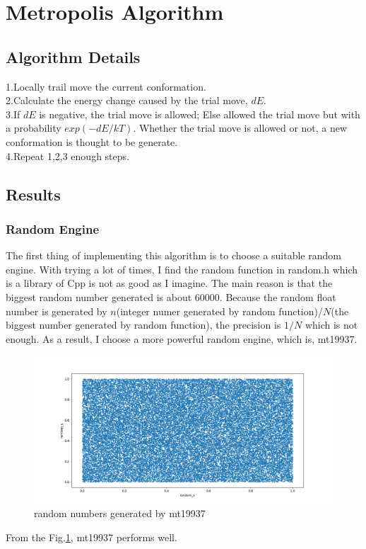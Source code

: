 \documentclass[UTF-8]{article}
\begin{document}
\section{Metropolis Algorithm}
\subsection{Algorithm Details}
\begin{framed}
1.Locally trail move the current conformation.\\
2.Calculate the energy change caused by the trial move, $dE$.\\
3.If $dE$ is negative, the trial move is allowed; Else allowed the trial move but with a probability $exp(-dE/kT)$. Whether the trial move is allowed or not, a new conformation is thought to be generate.\\
4.Repeat 1,2,3 enough steps.
\end{framed}
\subsection{Results}
\subsubsection{Random Engine}
The first thing of implementing this algorithm is to choose a suitable random engine. With trying a lot of times, I find the random function in random.h which is a library of Cpp is not as good as I imagine. The main reason is that the biggest random number generated is about 60000. Because the random float number is generated by $n$(integer numer generated by random function)/$N$(the biggest number generated by random function), the precision is $1/N$ which is not enough. As a result, I choose a more powerful random engine, which is, mt19937. 
\begin{figure}[H]
	\centering
	\includegraphics[width=1\textwidth]{random_engine.png}
	\caption{random numbers generated by mt19937}
	\label{fig_3}
\end{figure}
From the Fig.\ref{fig_3}, mt19937 performs well.
\end{document}

